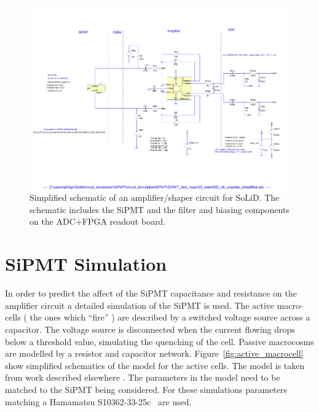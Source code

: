 \documentclass[
12pt, %
a4paper, %
oneside, %
headinclude,footinclude, %
apacite
]{scrartcl}
\begin{document}
\begin{figure}[tb]
\centering 
\includegraphics[width=\columnwidth]{SiPMT_test_mppc33_ada4932_v8_unipolar_simplified} 
\caption[Simplified SoLiD amplifier/shaper]{Simplified schematic of an amplifier/shaper circuit for SoLiD. The schematic includes the SiPMT and the filter and biasing components on the ADC+FPGA readout board.} %
\label{fig:ada4932_schematic_simplified}
\end{figure}


\section{SiPMT Simulation}

In order to predict the affect of the SiPMT capacitance and resistance on the amplifier circuit a detailed simulation of the SiPMT is used. The active macro-cells ( the ones which ``fire'' ) are described by a switched voltage source across a capacitor. The voltage source is disconnected when the current flowing drops below a threshold value, simulating the quenching of the cell. Passive macrocosms are modelled by a resistor and capacitor network. Figure~\vref{fig:active_macrocell} show simplified schematics of the model for the active cells. The model is taken from work described elsewhere \cite{Marano20131}. The parameters in the model need to be matched to the SiPMT being considered. For these simulations parameters matching a Hamamatsu S10362-33-25c~\cite{Hamamatsu_s12572} are used.
\end{document}
